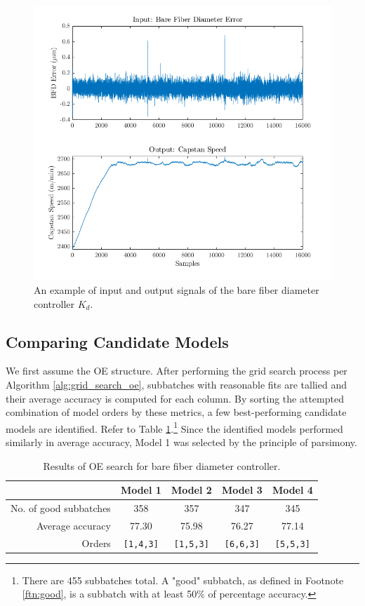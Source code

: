\begin{figure}[t]
    \centering
    \includegraphics[width=\textwidth]{figures/input_output.png}
    \caption{An example of input and output signals of the bare fiber diameter controller $K_d$.}
    \label{fig:bfd_input_output}
\end{figure}

\subsection*{Comparing Candidate Models}

We first assume the OE structure. After performing the grid search process per Algorithm \ref{alg:grid_search_oe}, subbatches with reasonable fits are tallied and their average accuracy is computed for each column. By sorting the attempted combination of model orders by these metrics, a few best-performing candidate models are identified. Refer to Table \ref{tab:kd_oe}.\footnote{There are 455 subbatches total. A "good" subbatch, as defined in Footnote \ref{ftn:good}, is a subbatch with at least 50\% of percentage accuracy.} Since the identified models performed similarly in average accuracy, Model 1 was selected by the principle of parsimony. 

\begin{table}[h!]
    \centering
    \begin{tabular}{r|cccc}
         & Model 1 & Model 2 & Model 3 & Model 4 \\ \hline
         No. of good subbatches & 358 & 357 & 347 & 345\\
         Average accuracy & 77.30 & 75.98 & 76.27 & 77.14 \\
         Orders & \texttt{[1,4,3]} & \texttt{[1,5,3]} & \texttt{[6,6,3]} & \texttt{[5,5,3]} \\ \hline
    \end{tabular}
    \caption{Results of OE search for bare fiber diameter controller.}
    \label{tab:kd_oe}
\end{table}

